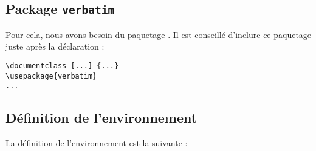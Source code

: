 \subsection{Package \texttt{verbatim}}
Pour cela, nous avons besoin du paquetage . Il est conseillé d'inclure ce paquetage juste après la déclaration  :

{\linespread{1}
\begin{verbatim}
\documentclass [...] {...}
\usepackage{verbatim}
...
\end{verbatim}
}

\subsection{Définition de l'environnement}
La définition de l'environnement  est la suivante :



